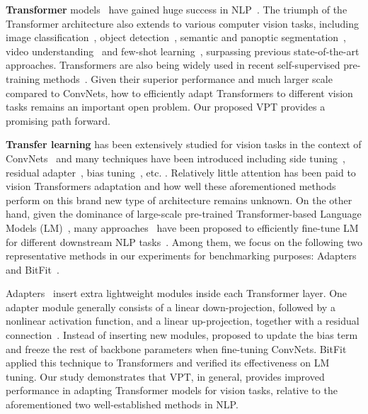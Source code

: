 \textbf{Transformer}
models~\cite{vaswani2017attention} have gained huge success in NLP~\cite{devlin-etal-2019-bert,2020t5,brown2020gpt3}. The triumph of the Transformer architecture also extends to various computer vision tasks, including image classification~\cite{dosovitskiy2020vit,liu2021swin}, object detection~\cite{carion2020end,li2021benchmarking}, semantic and panoptic segmentation~\cite{strudel2021segmenter,zheng2020rethinking,wang2021max}, video understanding~\cite{girdhar2019video,wang2022bevt,feichtenhofer2022masked} and few-shot learning~\cite{doersch2020crosstransformers}, surpassing previous state-of-the-art approaches. Transformers are also being widely used in recent self-supervised pre-training methods~\cite{chen2021mocov3,he2021mae,bao2021beit}. Given their superior performance and much larger scale compared to ConvNets, how to efficiently adapt Transformers to different vision tasks remains an important open problem. Our proposed VPT provides a promising path forward.

\textbf{Transfer learning} has been extensively studied for vision tasks in the context of ConvNets~\cite{zhuang2020comprehensive} and many techniques have been introduced including side tuning~\cite{zhang2020side}, residual adapter~\cite{rebuffi2017learning}, bias tuning~\cite{cai2020tinytl}, etc. . Relatively little attention has been paid to vision Transformers adaptation and how well these aforementioned methods perform on this brand new type of architecture remains unknown. On the other hand, given the dominance of large-scale pre-trained Transformer-based Language Models (LM)~\cite{devlin-etal-2019-bert,2020t5,brown2020gpt3}, many approaches~\cite{he2022towards,guo2020parameter,hu2021lora} have been proposed to efficiently fine-tune LM for different downstream NLP tasks~\cite{wang2018glue,wang2019superglue}. Among them, we focus on the following two representative methods in our experiments for benchmarking purposes: Adapters~\cite{pfeiffer2020AdapterHub} and BitFit~\cite{zaken2021bitfit}.

Adapters~\cite{houlsby2019parameter} insert extra lightweight modules inside each Transformer layer. One adapter module generally consists of a linear down-projection, followed by a nonlinear activation function, and a linear up-projection, together with a residual connection~\cite{pfeiffer2020adapterfusion,pfeiffer2020AdapterHub}. Instead of inserting new modules, \cite{cai2020tinytl} proposed to update the bias term and freeze the rest of backbone parameters when fine-tuning ConvNets. BitFit~\cite{bao2021beit} applied this technique to Transformers and verified its effectiveness on LM tuning. Our study demonstrates that VPT, in general, provides improved performance in adapting Transformer models for vision tasks, relative to the aforementioned two well-established methods in NLP.

